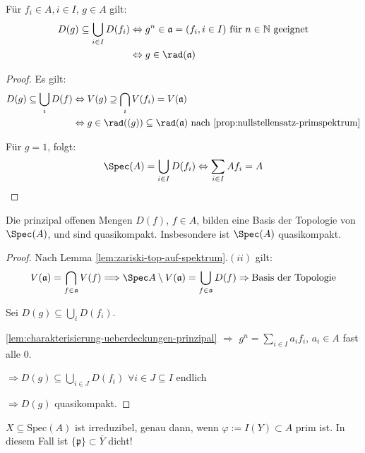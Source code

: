 \begin{lem}
\label{lem:charakterisierung-ueberdeckungen-prinzipal}
Für $f_{i} \in A, i\in I$, $g\in A$ gilt:
  \begin{align*}
    D(g)\subseteq\bigcup_{i\in I}D(f_{i})
    & \Leftrightarrow g^{n}\in\mathfrak{a}=(f_{i},i\in I)\text{ für }n \in \mathbb{N} \text{ geeignet}\\
    & \Leftrightarrow g\in\rad(\mathfrak{a})
  \end{align*}
\end{lem}
\begin{proof} Es gilt:
  \begin{align*}
    D(g)\subseteq\bigcup_{i}D(f)
    & \Leftrightarrow V(g)\supseteq\bigcap_{i} V(f_{i})=V(\mathfrak{a})\\
    & \Leftrightarrow g\in\rad((g))\subseteq\rad(\mathfrak{a}) \text{ nach } \ref{prop:nullstellensatz-primspektrum}
  \end{align*}

  Für $g=1$, folgt:
  \[ \Spec(A)=\bigcup_{i\in I}D(f_{i})\Leftrightarrow\sum_{i\in
      I}Af_{i}=A
  \]
\end{proof}
\begin{prop}
\label{prop:prinzipal-offene-bilden-basis}
Die prinzipal offenen Mengen $D(f)$, $f\in A$, bilden
  eine Basis der Topologie von $\Spec(A)$, und sind
  quasikompakt. Insbesondere ist $\Spec(A)$ quasikompakt.
\end{prop}
\begin{proof} Nach Lemma \ref{lem:zariski-top-auf-spektrum}$.(ii)$ gilt:
  \[
    V(\mathfrak{a})=\bigcap_{f \in\mathfrak{a}}V(f)\Longrightarrow\Spec A\setminus
    V(\mathfrak{a})=\bigcup_{f\in\mathfrak{a}}D(f)\Rightarrow\text{Basis
      der Topologie}
  \]

  Sei $D(g)\subseteq\bigcup_{i}D(f_{i})$.

  \ref{lem:charakterisierung-ueberdeckungen-prinzipal} $\Rightarrow$ $g^{n}=\sum_{i\in I}a_{i}f_{i}$, $a_{i}\in A$
  fast alle 0.

  $\Rightarrow D(g)\subseteq\bigcup_{i\in J}D(f_{i})$ $\forall i\in J\subseteq I$ endlich

  $\Rightarrow D(g)$ quasikompakt.
\end{proof}

\begin{prop}
  $X\subseteq\text{Spec}(A)$ ist irreduzibel, genau dann, wenn
  $\varphi:=I(Y)\subset A$ prim ist. In diesem Fall ist
  $\{\mathfrak{p}\}\subset\overline{Y}$ dicht!
\end{prop}

